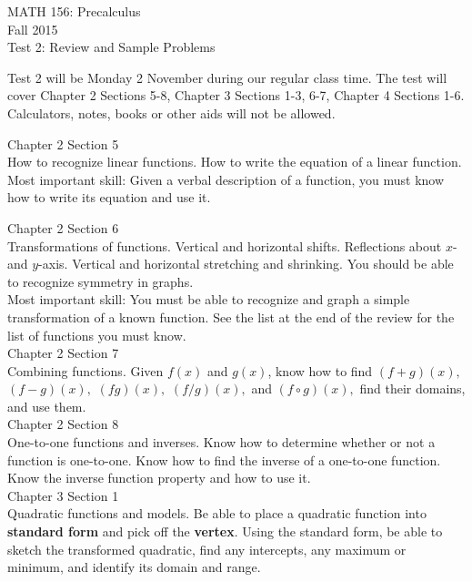 \documentclass[11pt]{article}
\begin{document}
 

\begin{center}MATH 156: Precalculus  \\ Fall 2015 \\ Test 2: Review and Sample Problems \end{center}

\hrulefill

Test 2 will be Monday 2 November during our regular class time. The test will cover Chapter 2 Sections 5-8, Chapter 3 Sections 1-3, 6-7, Chapter 4 Sections 1-6. Calculators, notes, books or other aids will not be allowed.

\hrulefill

Chapter 2 Section 5\\
How to recognize linear functions. How to write the equation of a linear function.\\
Most important skill: Given a verbal description of a function, you must know how to write its equation and use it.

Chapter 2 Section 6\\
Transformations of functions. Vertical and horizontal shifts. Reflections about $x$- and $y$-axis. Vertical and horizontal stretching and shrinking. You should be able to recognize symmetry in graphs.\\
Most important skill: You must be able to recognize and graph a simple transformation of a known function. See the list at the end of the review for the list of functions you must know.\\

Chapter 2 Section 7\\
Combining functions. Given $f(x)$ and $g(x)$, know how to find $(f+g)(x),$ $(f-g)(x),$ $(fg)(x),$ $(f/g)(x),$ and $(f\circ g)(x),$ find their domains, and use them. \\


Chapter 2 Section 8\\
One-to-one functions and inverses. Know how to determine whether or not a function is one-to-one. Know how to find the inverse of a one-to-one function. Know the inverse function property and how to use it.\\

Chapter 3 Section 1\\
Quadratic functions and models. Be able to place a quadratic function into {\bf{standard form}} and pick off the {\bf{vertex}}. Using the standard form, be able to sketch the transformed quadratic, find any intercepts, any maximum or minimum, and identify its domain and range.\\
\end{document}
